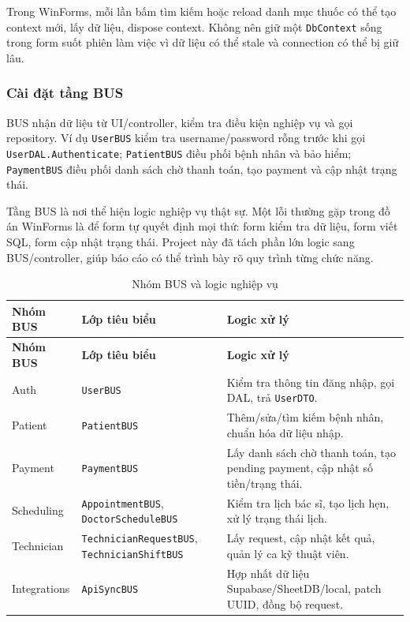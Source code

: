 \documentclass[12pt,a4paper]{article}
\numberwithin{figure}{subsection}
\numberwithin{table}{subsection}
\begin{document}
Trong WinForms, mỗi lần bấm tìm kiếm hoặc reload danh mục thuốc có thể tạo context mới, lấy dữ liệu, dispose context. Không nên giữ một \texttt{DbContext} sống trong form suốt phiên làm việc vì dữ liệu có thể stale và connection có thể bị giữ lâu.

\subsubsection{Cài đặt tầng BUS}

BUS nhận dữ liệu từ UI/controller, kiểm tra điều kiện nghiệp vụ và gọi repository. Ví dụ \texttt{UserBUS} kiểm tra username/password rỗng trước khi gọi \texttt{UserDAL.Authenticate}; \texttt{PatientBUS} điều phối bệnh nhân và bảo hiểm; \texttt{PaymentBUS} điều phối danh sách chờ thanh toán, tạo payment và cập nhật trạng thái.

Tầng BUS là nơi thể hiện logic nghiệp vụ thật sự. Một lỗi thường gặp trong đồ án WinForms là để form tự quyết định mọi thứ: form kiểm tra dữ liệu, form viết SQL, form cập nhật trạng thái. Project này đã tách phần lớn logic sang BUS/controller, giúp báo cáo có thể trình bày rõ quy trình từng chức năng.

\begin{longtable}{|p{4cm}|p{4.8cm}|p{5cm}|}
\caption{Nhóm BUS và logic nghiệp vụ} \\
\hline
\textbf{Nhóm BUS} & \textbf{Lớp tiêu biểu} & \textbf{Logic xử lý} \\
\hline
\endfirsthead
\hline
\textbf{Nhóm BUS} & \textbf{Lớp tiêu biểu} & \textbf{Logic xử lý} \\
\hline
\endhead
Auth & \texttt{UserBUS} & Kiểm tra thông tin đăng nhập, gọi DAL, trả \texttt{UserDTO}. \\
\hline
Patient & \texttt{PatientBUS} & Thêm/sửa/tìm kiếm bệnh nhân, chuẩn hóa dữ liệu nhập. \\
\hline
Payment & \texttt{PaymentBUS} & Lấy danh sách chờ thanh toán, tạo pending payment, cập nhật số tiền/trạng thái. \\
\hline
Scheduling & \texttt{AppointmentBUS}, \texttt{DoctorScheduleBUS} & Kiểm tra lịch bác sĩ, tạo lịch hẹn, xử lý trạng thái lịch. \\
\hline
Technician & \texttt{TechnicianRequestBUS}, \texttt{TechnicianShiftBUS} & Lấy request, cập nhật kết quả, quản lý ca kỹ thuật viên. \\
\hline
Integrations & \texttt{ApiSyncBUS} & Hợp nhất dữ liệu Supabase/SheetDB/local, patch UUID, đồng bộ request. \\
\hline
\end{longtable}
\end{document}
